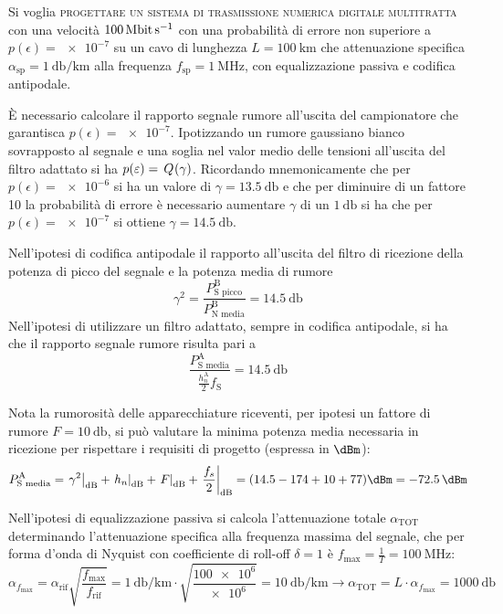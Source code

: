 \begin{esercizio}
	Si voglia \textsc{progettare un sistema di trasmissione numerica digitale multitratta} con una velocità $\SI{100}{\mega\bit\per\second}$ con una probabilità di errore non superiore a $p(\epsilon)=\num{e-7}$ su un cavo di lunghezza $L=\SI{100}{\kilo\meter}$ che attenuazione specifica $\alpha_\text{sp}=\SI{1}{\decibel\per\kilo\meter}$ alla frequenza $f_\text{sp}=\SI{1}{\mega\hertz}$, con equalizzazione passiva e codifica antipodale.
\end{esercizio}

\`{E} necessario calcolare il rapporto segnale rumore all'uscita del campionatore che garantisca $p(\epsilon)=\num{e-7}$. Ipotizzando un rumore gaussiano bianco sovrapposto al segnale e una soglia nel valor medio delle tensioni all'uscita del filtro adattato si ha $p(\varepsilon)=\,{Q}^{}\!\left({\gamma}\right)$. Ricordando mnemonicamente che per $p(\epsilon)=\num{e-6}$ si ha un valore di $\gamma=\SI{13.5}{\decibel}$ e che per diminuire di un fattore 10 la probabilità di errore è necessario aumentare $\gamma$ di un $\SI{1}{\decibel}$ si ha che per $p(\epsilon)=\num{e-7}$ si ottiene $\gamma=\SI{14.5}{\decibel}$.

Nell'ipotesi di codifica antipodale il rapporto all'uscita del filtro di ricezione della potenza di picco del segnale e la potenza media di rumore
\[\gamma^2=\frac{P_\text{S picco}^\text{B}}{P_\text{N media}^\text{B}}=\SI{14.5}{\decibel}\]
Nell'ipotesi di utilizzare un filtro adattato, sempre in codifica antipodale, si ha che il rapporto segnale rumore risulta pari a 
\[\frac{P_\text{S media}^\text{A}}{\frac{h_n^\text{A}}{2} f_\text{S}}=\SI{14.5}{\decibel}\]

Nota la rumorosità delle apparecchiature riceventi, per ipotesi un fattore di rumore $F=\SI{10}{\decibel}$, si può valutare la minima potenza media necessaria in ricezione per rispettare i requisiti di progetto (espressa in $\si{\dBm}$):
\[P_\text{S media}^\text{A}=\restrict{\gamma^2}{\si{\decibel}}+\restrict{h_n}{\si{\decibel}}+\restrict{F}{\si{\decibel}}+\restrict{\frac{f_s}{2}}{\si{\decibel}}=(\num{14.5}-174+10+77)\si{\dBm}=\SI{-72.5}{\dBm}\]

Nell'ipotesi di equalizzazione passiva si calcola l'attenuazione totale $\alpha_\text{TOT}$ determinando l'attenuazione specifica alla frequenza massima del segnale, che per forma d'onda di Nyquist con coefficiente di roll-off $\delta=1$ è $f_\text{max}=\frac{1}{T}=\SI{100}{\mega\hertz}$:
\[\alpha_{f_\text{max}}=\alpha_\text{rif}\sqrt{\frac{f_\text{max}}{f_\text{rif}}}=\SI{1}{\decibel\per\kilo\meter}\cdot\sqrt{\frac{\num{100e6}}{\num{e6}}}=\SI{10}{\decibel\per\kilo\meter}\to \alpha_\text{TOT}=L\cdot\alpha_{f_\text{max}}=\SI{1000}{\decibel}\]

